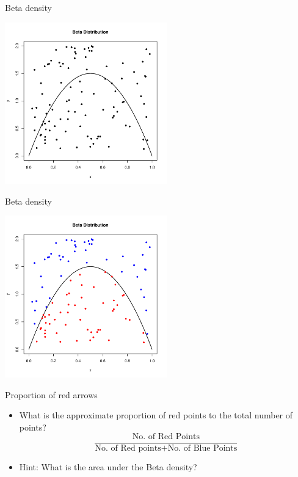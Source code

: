 \documentclass
[handout]
{beamer}
\begin{document}
\begin{frame}{Beta density}
\begin{center}
\includegraphics[height=7cm]{./Pics/bet2.pdf}
\end{center}
\end{frame}
\begin{frame}{Beta density}
\begin{center}
\includegraphics[height=7cm]{./Pics/bet3.pdf}
\end{center}
\end{frame}
\begin{frame}{Proportion of red arrows}
\begin{itemize}
\item What is the approximate proportion of red points to the total number of points?
\pause
\begin{equation*}
\frac{\mbox{No. of Red Points}}{\mbox{No. of Red points+No. of Blue Points}}
\end{equation*}
\pause
\item Hint: What is the area under the Beta density?
\end{itemize}
\end{frame}
\end{document}
